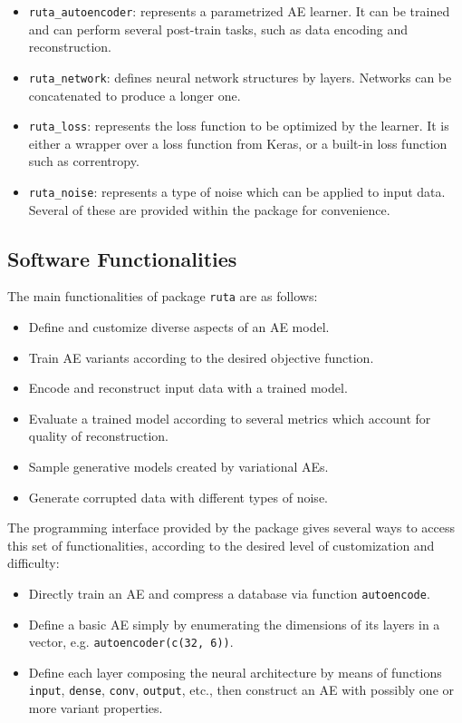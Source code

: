 \documentclass[
	fontsize=11pt, %
	twoside=false, %
	open=any, %
	secnumdepth=1, %
]{kaobook}
\newcommand{\revised}[1]{#1}
\begin{document}
  \begin{itemize}
  \item \texttt{ruta\_autoencoder}: represents a parametrized AE learner. It can be trained and can perform several post-train tasks, such as data encoding and reconstruction.
  \item \texttt{ruta\_network}: defines neural network structures by layers. Networks can be concatenated to produce a longer one.
  \item \texttt{ruta\_loss}: represents the loss function to be optimized by the learner. It is either a wrapper over a loss function from Keras, or a built-in loss function such as correntropy.
  \item \texttt{ruta\_noise}: represents a type of noise which can be applied to input data. Several of these are provided within the package for convenience.
  \end{itemize}


  
\subsection{Software Functionalities}
\label{sec.functionality}

The main functionalities of package \texttt{ruta} are as follows:

\begin{itemize}
  \item Define and customize diverse aspects of an AE model.
\item Train AE variants according to the desired objective function.
\item Encode and reconstruct input data with a trained model.
\item Evaluate a trained model according to several metrics which account for quality of reconstruction.
\item Sample generative models created by variational AEs.
  \item Generate corrupted data with different types of noise.
\end{itemize}

The programming interface provided by the package gives several ways to access this set of functionalities, according to the desired level of customization and difficulty:

\begin{itemize}
\item Directly train an AE and compress a database via function \texttt{autoencode}.
\item Define a basic AE simply by enumerating the dimensions of its layers in a vector, e.g. \texttt{autoencoder(c(32, 6))}.
  \item Define each layer composing the neural architecture by means of functions \texttt{input}, \texttt{dense}, \revised{\texttt{conv},} \texttt{output}, etc., then construct an AE with possibly one or more variant properties.
\end{itemize}
\end{document}
